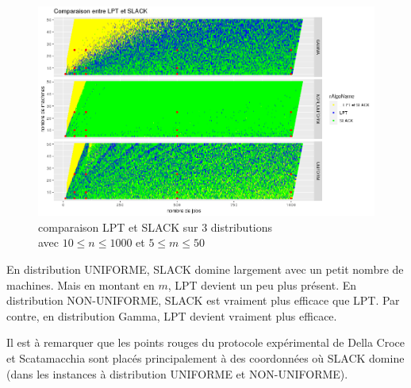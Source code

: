 \documentclass[a4paper,12pt]{report}
\theoremstyle{plain}				%
\theoremstyle{definition}				%
\begin{document}
\begin{figure}
{\centering
\includegraphics[width=\columnwidth]{8_comparaison_LPT_SLACK_2D.png}
\caption{comparaison LPT et SLACK sur 3 distributions\\
\hspace{\linewidth} avec $10\leq n \leq 1000$ et $5\leq m \leq 50$}
\label{fig:resultatComparaisonLPTSLACK}
\par}
\end{figure}


En distribution UNIFORME, SLACK domine largement avec 
  un petit nombre de machines. Mais en montant en $m$, LPT devient un peu 
  plus présent.
En distribution NON-UNIFORME, SLACK est vraiment plus efficace que LPT.
Par contre, en distribution Gamma, LPT devient vraiment plus efficace.

Il est à remarquer que les points rouges du protocole expérimental de 
  Della Croce et Scatamacchia sont placés principalement à des coordonnées
  où SLACK domine (dans les instances à distribution UNIFORME et NON-UNIFORME).
\end{document}
